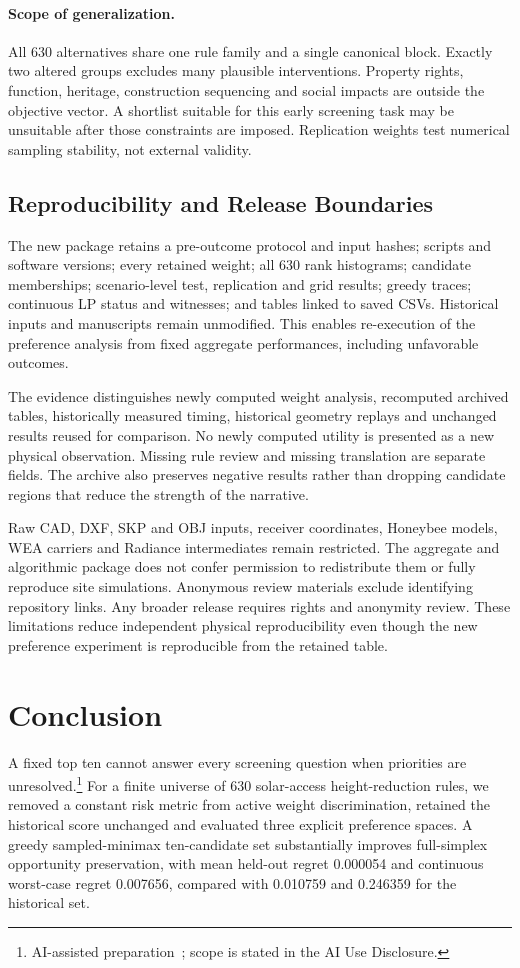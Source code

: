 \documentclass{llncs}
\newcommand{\aidraft}{\footnote{AI-assisted preparation~\cite{openai2026}; scope is stated in the AI Use Disclosure.}}
\begin{document}
\paragraph{Scope of generalization.} All 630 alternatives share one rule family and a single canonical block. Exactly two altered groups excludes many plausible interventions. Property rights, function, heritage, construction sequencing and social impacts are outside the objective vector. A shortlist suitable for this early screening task may be unsuitable after those constraints are imposed. Replication weights test numerical sampling stability, not external validity.

\subsection{Reproducibility and Release Boundaries}
The new package retains a pre-outcome protocol and input hashes; scripts and software versions; every retained weight; all 630 rank histograms; candidate memberships; scenario-level test, replication and grid results; greedy traces; continuous LP status and witnesses; and tables linked to saved CSVs. Historical inputs and manuscripts remain unmodified. This enables re-execution of the preference analysis from fixed aggregate performances, including unfavorable outcomes.

The evidence distinguishes newly computed weight analysis, recomputed archived tables, historically measured timing, historical geometry replays and unchanged results reused for comparison. No newly computed utility is presented as a new physical observation. Missing rule review and missing translation are separate fields. The archive also preserves negative results rather than dropping candidate regions that reduce the strength of the narrative.

Raw CAD, DXF, SKP and OBJ inputs, receiver coordinates, Honeybee models, WEA carriers and Radiance intermediates remain restricted. The aggregate and algorithmic package does not confer permission to redistribute them or fully reproduce site simulations. Anonymous review materials exclude identifying repository links. Any broader release requires rights and anonymity review. These limitations reduce independent physical reproducibility even though the new preference experiment is reproducible from the retained table.

\section{Conclusion}
A fixed top ten cannot answer every screening question when priorities are unresolved.\aidraft{} For a finite universe of 630 solar-access height-reduction rules, we removed a constant risk metric from active weight discrimination, retained the historical score unchanged and evaluated three explicit preference spaces. A greedy sampled-minimax ten-candidate set substantially improves full-simplex opportunity preservation, with mean held-out regret 0.000054 and continuous worst-case regret 0.007656, compared with 0.010759 and 0.246359 for the historical set.
\end{document}
